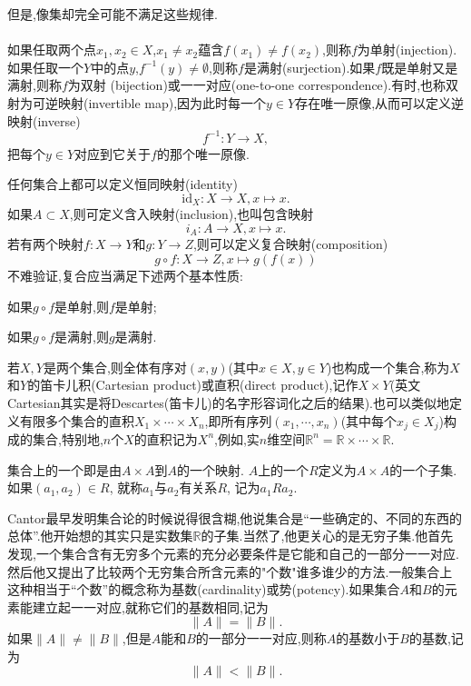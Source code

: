 但是,像集却完全可能不满足这些规律.
\\ \hspace*{\fill} \\%
如果任取两个点$x_1,x_2\in X$,$x_1\neq x_2$蕴含$f(x_1)\neq f(x_2)$,则称$f$为单射(injection).如果任取一个$Y$中的点$y$,$f^{-1}(y)\neq\emptyset$,则称$f$是满射(surjection).如果$f$既是单射又是满射,则称$f$为双射 (bijection)或一一对应(one-to-one correspondence).有时,也称双射为可逆映射(invertible map),因为此时每一个$y\in Y$存在唯一原像,从而可以定义逆映射(inverse)
\begin{equation}
f^{-1}:Y\to X,
\end{equation}
把每个$y\in Y$对应到它关于$f$的那个唯一原像.

任何集合上都可以定义恒同映射(identity)\begin{equation}
\mathrm{id}_X:X\to X,x\mapsto x.
\end{equation}
如果$A\subset X$,则可定义含入映射(inclusion),也叫包含映射\begin{equation}
i_A:A\to X,x\mapsto x.
\end{equation}
若有两个映射$f:X\to Y$和$g:Y\to Z$,则可以定义复合映射(composition)\begin{equation}
g\circ f:X\to Z,x\mapsto g(f(x))
\end{equation}
不难验证,复合应当满足下述两个基本性质:
\begin{blist}
	\item 如果$g\circ f$是单射,则$f$是单射;
	\item 如果$g\circ f$是满射,则$g$是满射.
\end{blist}

若$X,Y$是两个集合,则全体有序对$(x,y)$(其中$x\in X,y\in Y$)也构成一个集合,称为$X$和$Y$的笛卡儿积(Cartesian product)或直积(direct product),记作$X\times Y$(英文Cartesian其实是将Descartes(笛卡儿)的名字形容词化之后的结果).也可以类似地定义有限多个集合的直积$X_1\times \cdots \times X_n$,即所有序列$(x_1,\cdots,x_n)$(其中每个$x_j\in X_j$)构成的集合,特别地,$n$个$X$的直积记为$X^n$,例如,实$n$维空间$\mathbb{R}^n = \mathbb{R}\times\cdots\times\mathbb{R}$.

集合上的一个即是由$A\times A$到$A$的一个映射. $A$上的一个$R$定义为$A\times A$的一个子集. 如果$(a_1,a_2)\in R$, 就称$a_1$与$a_2$有关系$R$, 记为$a_1Ra_2$.

Cantor最早发明集合论的时候说得很含糊,他说集合是“一些确定的、不同的东西的总体”.他开始想的其实只是实数集$\mathbb{R}$的子集.当然了,他更关心的是无穷子集.他首先发现,一个集合含有无穷多个元素的充分必要条件是它能和自己的一部分一一对应.然后他又提出了比较两个无穷集合所含元素的"个数"谁多谁少的方法.一般集合上这种相当于“个数”的概念称为基数(cardinality)或势(potency).如果集合$A$和$B$的元素能建立起一一对应,就称它们的基数相同,记为\begin{equation}
\|A\| = \|B\|.
\end{equation}
如果$\|A\|\neq\|B\|$,但是$A$能和$B$的一部分一一对应,则称$A$的基数小于$B$的基数,记为\begin{equation}
\|A\| < \|B\|.
\end{equation}


